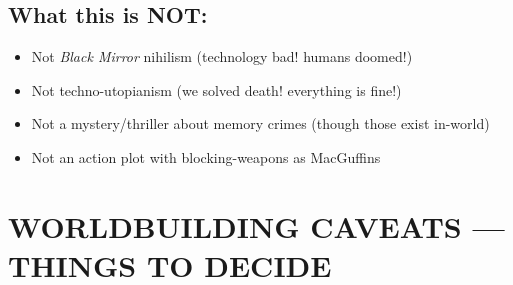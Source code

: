 \documentclass[11pt,letterpaper]{article}
\begin{document}
\subsection*{What this is NOT:}

\begin{itemize}[leftmargin=*]
    \item Not \textit{Black Mirror} nihilism (technology bad! humans doomed!)
    \item Not techno-utopianism (we solved death! everything is fine!)
    \item Not a mystery/thriller about memory crimes (though those exist in-world)
    \item Not an action plot with blocking-weapons as MacGuffins
\end{itemize}

\vspace{1em}

\section*{WORLDBUILDING CAVEATS --- THINGS TO DECIDE}
\end{document}

